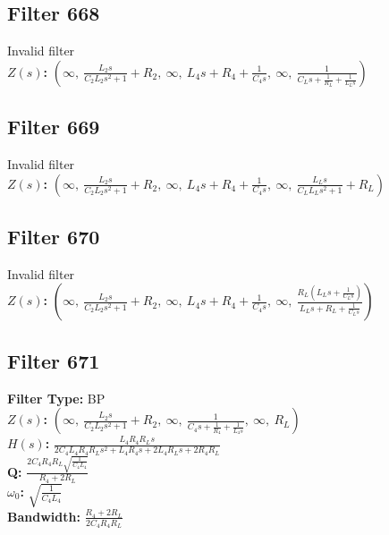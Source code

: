 \documentclass{article}
\begin{document}
\subsection*{Filter 668}
Invalid filter \\ 
\textbf{$Z(s)$:} $\left( \infty, \  \frac{L_{2} s}{C_{2} L_{2} s^{2} + 1} + R_{2}, \  \infty, \  L_{4} s + R_{4} + \frac{1}{C_{4} s}, \  \infty, \  \frac{1}{C_{L} s + \frac{1}{R_{L}} + \frac{1}{L_{L} s}}\right)$ \\ 
\subsection*{Filter 669}
Invalid filter \\ 
\textbf{$Z(s)$:} $\left( \infty, \  \frac{L_{2} s}{C_{2} L_{2} s^{2} + 1} + R_{2}, \  \infty, \  L_{4} s + R_{4} + \frac{1}{C_{4} s}, \  \infty, \  \frac{L_{L} s}{C_{L} L_{L} s^{2} + 1} + R_{L}\right)$ \\ 
\subsection*{Filter 670}
Invalid filter \\ 
\textbf{$Z(s)$:} $\left( \infty, \  \frac{L_{2} s}{C_{2} L_{2} s^{2} + 1} + R_{2}, \  \infty, \  L_{4} s + R_{4} + \frac{1}{C_{4} s}, \  \infty, \  \frac{R_{L} \left(L_{L} s + \frac{1}{C_{L} s}\right)}{L_{L} s + R_{L} + \frac{1}{C_{L} s}}\right)$ \\ 
\subsection*{Filter 671}
\textbf{Filter Type:} BP \\ 
\textbf{$Z(s)$:} $\left( \infty, \  \frac{L_{2} s}{C_{2} L_{2} s^{2} + 1} + R_{2}, \  \infty, \  \frac{1}{C_{4} s + \frac{1}{R_{4}} + \frac{1}{L_{4} s}}, \  \infty, \  R_{L}\right)$ \\ 
\textbf{$H(s)$:} $\frac{L_{4} R_{4} R_{L} s}{2 C_{4} L_{4} R_{4} R_{L} s^{2} + L_{4} R_{4} s + 2 L_{4} R_{L} s + 2 R_{4} R_{L}}$ \\ 
\textbf{Q:} $\frac{2 C_{4} R_{4} R_{L} \sqrt{\frac{1}{C_{4} L_{4}}}}{R_{4} + 2 R_{L}}$ \\ 
\textbf{$\omega_0$:} $\sqrt{\frac{1}{C_{4} L_{4}}}$ \\ 
\textbf{Bandwidth:} $\frac{R_{4} + 2 R_{L}}{2 C_{4} R_{4} R_{L}}$ \\ 
\end{document}
